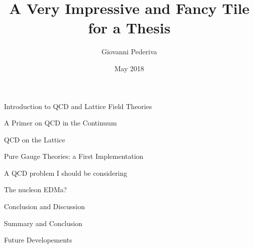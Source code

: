 \documentclass[twoside,english, a4paper, 11pt]{shared/uiofysmaster}
\author{Giovanni Pederiva}
\title{\bf{A Very Impressive and Fancy Tile for a Thesis}}
\date{May 2018}
\begin{document}


\maketitle
\clearpage

\tableofcontents
\clearpage

\begin{abstract}
	
\end{abstract}
\begin{acknowledgements}
	
\end{acknowledgements}

\begin{part}{Introduction to QCD and Lattice Field Theories}
	\label{part:intro}
	\begin{chapter}{A Primer on QCD in the Continuum}
		\label{chap:qcd_intro}
  		
	\end{chapter}

	\begin{chapter}{QCD on the Lattice}
		\label{chap:lattice_intro}
	  	
	\end{chapter}

	\begin{chapter}{Pure Gauge Theories: a First Implementation}
		\label{chap:puregauge_intro}
	  	
	\end{chapter}
\end{part}

\begin{part}{A QCD problem I should be considering}
	\begin{chapter}{The nucleon EDMa?}
	\end{chapter}
\end{part}

\begin{part}{Conclusion and Discussion}
	\label{part:conclusion}
	\begin{chapter}{Summary and Conclusion}
		\label{chap:conclusion}
		
	\end{chapter}
	\begin{chapter}{Future Developements}
		\label{chap:future}
		
	\end{chapter}
\end{part}


%		




\end{document}
